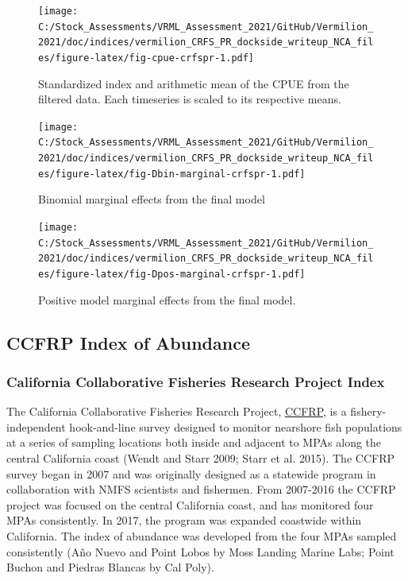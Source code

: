 \documentclass[
  english,
  a4paper,
]{article}
\begin{document}
\begin{figure}
\centering
\texttt{[image: C:/Stock\_Assessments/VRML\_Assessment\_2021/GitHub/Vermilion\_2021/doc/indices/vermilion\_CRFS\_PR\_dockside\_writeup\_NCA\_files/figure-latex/fig-cpue-crfspr-1.pdf]}
\caption{\label{fig:fig-cpue-crfspr}Standardized index and arithmetic mean of the CPUE from the filtered data. Each timeseries is scaled to its respective means.}
\end{figure}

\begin{figure}
\centering
\texttt{[image: C:/Stock\_Assessments/VRML\_Assessment\_2021/GitHub/Vermilion\_2021/doc/indices/vermilion\_CRFS\_PR\_dockside\_writeup\_NCA\_files/figure-latex/fig-Dbin-marginal-crfspr-1.pdf]}
\caption{\label{fig:fig-Dbin-marginal-crfspr}Binomial marginal effects from the final model}
\end{figure}

\begin{figure}
\centering
\texttt{[image: C:/Stock\_Assessments/VRML\_Assessment\_2021/GitHub/Vermilion\_2021/doc/indices/vermilion\_CRFS\_PR\_dockside\_writeup\_NCA\_files/figure-latex/fig-Dpos-marginal-crfspr-1.pdf]}
\caption{\label{fig:fig-Dpos-marginal-crfspr}Positive model marginal effects from the final model.}
\end{figure}

\clearpage

\hypertarget{ccfrp-index}{%
\subsection{CCFRP Index of Abundance}\label{ccfrp-index}}

\hypertarget{california-collaborative-fisheries-research-project-index}{%
\subsubsection{California Collaborative Fisheries Research Project Index}\label{california-collaborative-fisheries-research-project-index}}

The California Collaborative Fisheries Research Project, \href{https://www.mlml.calstate.edu/ccfrp/}{CCFRP},
is a fishery-independent
hook-and-line survey designed to monitor nearshore fish populations at a series of sampling
locations both inside and adjacent to MPAs along the central California coast
(Wendt and Starr 2009; Starr et al. 2015). The CCFRP survey began in 2007 and was originally
designed as a statewide program in collaboration with NMFS scientists and fishermen.
From 2007-2016 the CCFRP project was focused on the central California coast, and has monitored
four MPAs consistently. In 2017,
the program was expanded coastwide within California. The index of abundance was
developed from the four MPAs sampled consistently (Año Nuevo and Point Lobos
by Moss Landing Marine Labs; Point Buchon and Piedras Blancas by Cal Poly).
\end{document}

